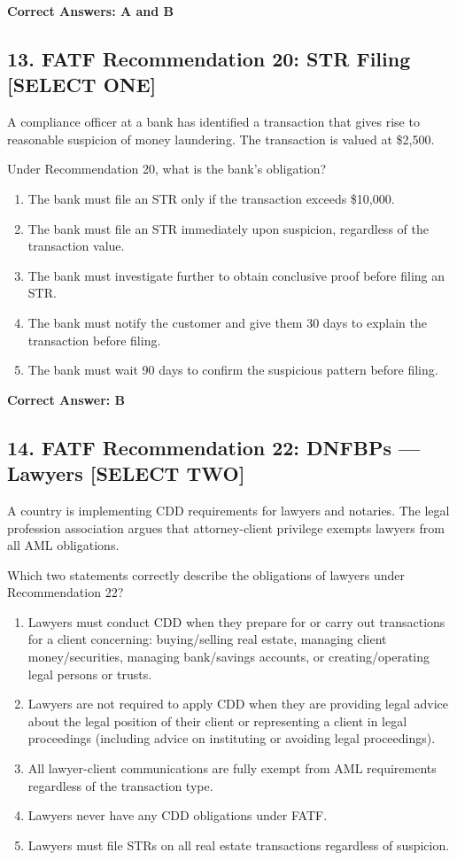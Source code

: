 \documentclass[11pt,a4paper]{article}
\begin{document}
	\textbf{Correct Answers: A and B}
	
	\subsection{13. FATF Recommendation 20: STR Filing \textnormal{[SELECT ONE]}}
	
	A compliance officer at a bank has identified a transaction that gives rise to reasonable suspicion of money laundering. The transaction is valued at \$2,500.
	
	Under Recommendation 20, what is the bank's obligation?
	
	\begin{enumerate}[label=\Alph*.]
		\item The bank must file an STR only if the transaction exceeds \$10,000.
		\item The bank must file an STR immediately upon suspicion, regardless of the transaction value.
		\item The bank must investigate further to obtain conclusive proof before filing an STR.
		\item The bank must notify the customer and give them 30 days to explain the transaction before filing.
		\item The bank must wait 90 days to confirm the suspicious pattern before filing.
	\end{enumerate}
	
	\textbf{Correct Answer: B}
	
	\subsection{14. FATF Recommendation 22: DNFBPs — Lawyers \textnormal{[SELECT TWO]}}
	
	A country is implementing CDD requirements for lawyers and notaries. The legal profession association argues that attorney-client privilege exempts lawyers from all AML obligations.
	
	Which two statements correctly describe the obligations of lawyers under Recommendation 22?
	
	\begin{enumerate}[label=\Alph*.]
		\item Lawyers must conduct CDD when they prepare for or carry out transactions for a client concerning: buying/selling real estate, managing client money/securities, managing bank/savings accounts, or creating/operating legal persons or trusts.
		\item Lawyers are not required to apply CDD when they are providing legal advice about the legal position of their client or representing a client in legal proceedings (including advice on instituting or avoiding legal proceedings).
		\item All lawyer-client communications are fully exempt from AML requirements regardless of the transaction type.
		\item Lawyers never have any CDD obligations under FATF.
		\item Lawyers must file STRs on all real estate transactions regardless of suspicion.
	\end{enumerate}
	
\end{document}

